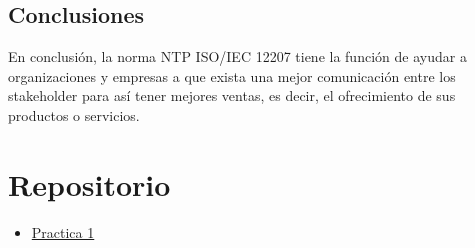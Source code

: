 \documentclass{article}
\begin{document}
\pagebreak
\subsection{Conclusiones}\label{sec:conclusiones}
En conclusión, la norma NTP ISO/IEC 12207 tiene la función de ayudar a
organizaciones y empresas a que exista una mejor comunicación entre los
stakeholder para así tener mejores ventas, es decir, el ofrecimiento de sus
productos o servicios.

%

\nocite{*}

%

\section{Repositorio}\label{sec:Repositorio}
\begin{itemize}
    \item {\color{blue}\href{https://github.com/pintovillamar/software-construction/tree/main/pract01/NTPISOIEC12207_2016}{Practica 1}}
\end{itemize}
\end{document}
